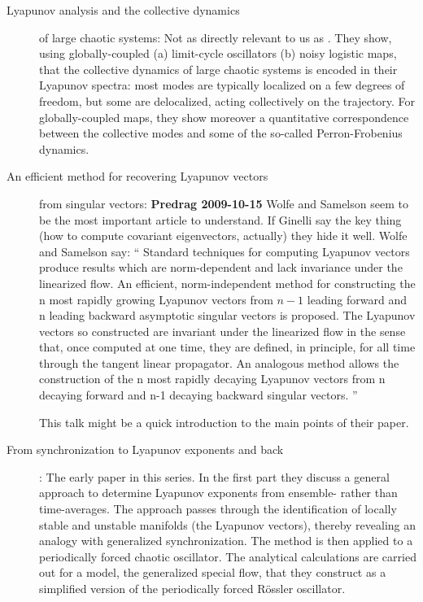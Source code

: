 \begin{description}
\item[Lyapunov analysis and the collective dynamics]
of large chaotic systems:
Not as directly relevant to us as .
They show, using globally-coupled (a) limit-cycle oscillators
(b) noisy logistic maps, that the collective dynamics
of large chaotic systems is encoded in their Lyapunov spectra:
most modes are typically localized on a few degrees of freedom,
but some are delocalized, acting collectively on the trajectory.
For globally-coupled maps, they show moreover a quantitative
correspondence between the collective modes and some of the
so-called Perron-Frobenius dynamics.


\item[An efficient method for recovering Lyapunov vectors] from
singular vectors: {\bf Predrag 2009-10-15} Wolfe
and Samelson seem to be the most important article to
understand. If Ginelli \etal{} say the key
thing (how to compute covariant eigenvectors, actually) they
hide it well.
Wolfe and Samelson say: `` Standard techniques for computing
Lyapunov vectors produce results which are norm-dependent and
lack invariance under the linearized flow. An efficient,
norm-independent method for constructing the n most rapidly
growing Lyapunov vectors from $n\!-\!1$ leading forward and n
leading backward asymptotic singular vectors is proposed. The
Lyapunov vectors so constructed are invariant under the
linearized flow in the sense that, once computed at one time,
they are defined, in principle, for all time through the
tangent linear propagator. An analogous method allows the
construction of the n most rapidly decaying Lyapunov vectors
from n decaying forward and n-1 decaying backward singular
vectors. ''

{This talk} might be a quick introduction to the main points of their
paper.

\item[From synchronization to Lyapunov exponents and
              back]:
The early paper in this series.
In the first part they discuss a general approach to determine
Lyapunov exponents from ensemble- rather than time-averages.
The approach passes through the identification of locally
stable and unstable manifolds (the Lyapunov vectors), thereby
revealing an analogy with generalized synchronization. The
method is then applied to a periodically forced chaotic
oscillator. The
analytical calculations are carried out for a model, the
generalized special flow, that they construct as a simplified
version of the periodically forced R\"ossler oscillator.


\end{description}
